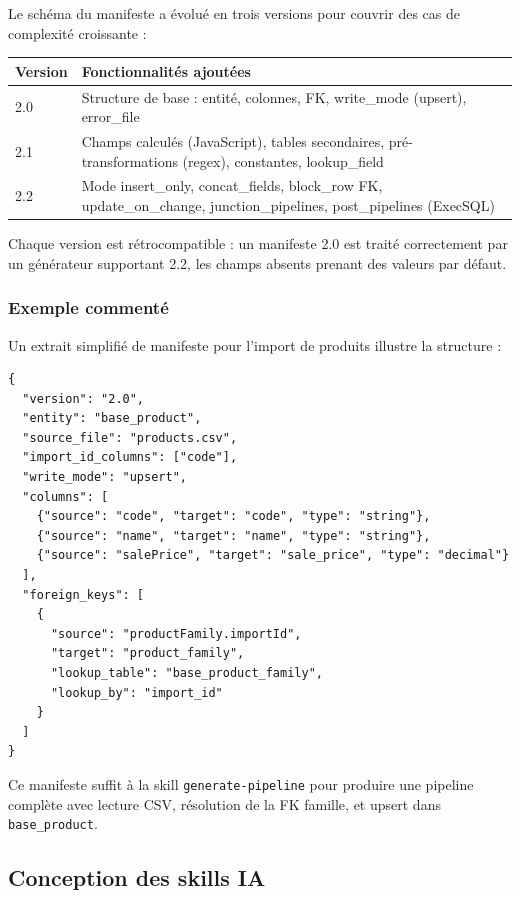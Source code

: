 \documentclass[a4paper,12pt]{article}
\begin{document}
Le schéma du manifeste a évolué en trois versions pour couvrir des cas de complexité croissante :

\begin{center}
\begin{tabular}{|l|p{}|}
\hline
\textbf{Version} & \textbf{Fonctionnalités ajoutées} \\
\hline
2.0 & Structure de base : entité, colonnes, FK, write\_mode (upsert), error\_file \\
\hline
2.1 & Champs calculés (JavaScript), tables secondaires, pré-transformations (regex), constantes, lookup\_field \\
\hline
2.2 & Mode insert\_only, concat\_fields, block\_row FK, update\_on\_change, junction\_pipelines, post\_pipelines (ExecSQL) \\
\hline
\end{tabular}
\end{center}

Chaque version est rétrocompatible : un manifeste 2.0 est traité correctement par un générateur supportant 2.2, les champs absents prenant des valeurs par défaut.

\subsubsection{Exemple commenté}

Un extrait simplifié de manifeste pour l'import de produits illustre la structure :

\begin{verbatim}
{
  "version": "2.0",
  "entity": "base_product",
  "source_file": "products.csv",
  "import_id_columns": ["code"],
  "write_mode": "upsert",
  "columns": [
    {"source": "code", "target": "code", "type": "string"},
    {"source": "name", "target": "name", "type": "string"},
    {"source": "salePrice", "target": "sale_price", "type": "decimal"}
  ],
  "foreign_keys": [
    {
      "source": "productFamily.importId",
      "target": "product_family",
      "lookup_table": "base_product_family",
      "lookup_by": "import_id"
    }
  ]
}
\end{verbatim}

Ce manifeste suffit à la skill \texttt{generate-pipeline} pour produire une pipeline complète avec lecture CSV, résolution de la FK famille, et upsert dans \texttt{base\_product}.

\subsection{Conception des skills IA}
\end{document}

